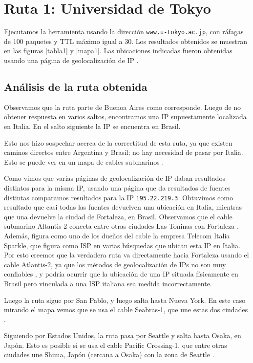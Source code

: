 \section{Ruta 1: Universidad de Tokyo}

Ejecutamos la herramienta usando la dirección \texttt{www.u-tokyo.ac.jp}, con ráfagas de 100 paquetes y TTL máximo igual a 30. Los resultados obtenidos se muestran en las figuras \ref{tabla1} y \ref{mapa1}. Las ubicaciones indicadas fueron obtenidas usando una página de geolocalización de IP \cite{ip2location}.

\subsection{Análisis de la ruta obtenida}
Observamos que la ruta parte de Buenoa Aires como corresponde. Luego de no obtener respuesta en varios saltos, encontramos una IP supuestamente localizada en Italia. En el salto siguiente la IP se encuentra en Brasil.

Esto nos hizo sospechar acerca de la correctitud de esta ruta, ya que existen caminos directos entre Argentina y Brasil; no hay necesidad de pasar por Italia. Esto se puede ver en un mapa de cables submarinos \cite{cables}.

Como vimos que varias páginas de geolocalización de IP daban resultados distintos para la misma IP, usando una página que da resultados de fuentes distintas \cite{iplocation} comparamos resultados para la IP \texttt{195.22.219.3}. Obtuvimos como resultado que casi todas las fuentes devuelven una ubicación en Italia, mientras que una devuelve la ciudad de Fortaleza, en Brasil. Observamos que el cable submarino Altantis-2 conecta entre otras ciudades Las Toninas con Fortaleza \cite{atlantis2}. Además, figura como uno de los dueños del cable la empresa Telecom Italia Sparkle, que figura como ISP en varias búsquedas que ubican esta IP en Italia. Por esto creemos que la verdadera ruta va directamente hacia Fortaleza usando el cable Atlantis-2, ya que los métodos de geolocalización de IPs no son muy confiables \cite{accuracy}, y podría ocurrir que la ubicación de una IP situada físicamente en Brasil pero vinculada a una ISP italiana sea medida incorrectamente.

Luego la ruta sigue por San Pablo, y luego salta hasta Nueva York. En este caso mirando el mapa \cite{cables} vemos que se usa el cable Seabras-1, que une estas dos ciudades \cite{seabras1}.

Siguiendo por Estados Unidos, la ruta pasa por Seattle y salta hasta Osaka, en Japón. Esto es posible si se usa el cable Pacific Crossing-1, que entre otras ciudades une Shima, Japón (cercana a Osaka) con la zona de Seattle \cite{pc1}.

